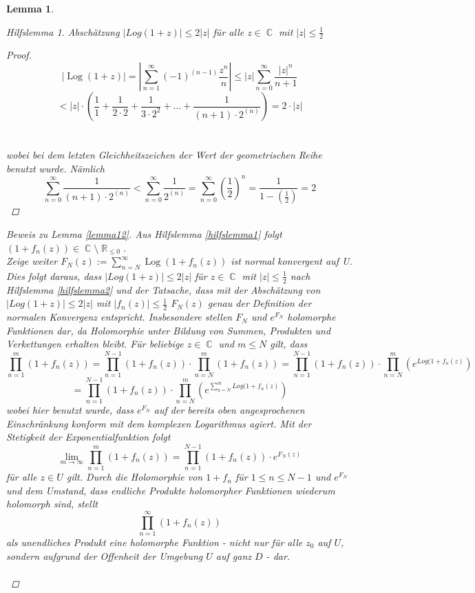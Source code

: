 \documentclass[10pt,a4paper]{article}
\theoremstyle{plain}
\newtheorem{lem}[thm]{Lemma}
\theoremstyle{definition}
\theoremstyle{remark}
\newtheorem{hilfslem}{Hilfslemma}
\DeclareMathOperator{\R}{\mathbb{R}}
\DeclareMathOperator{\C}{\mathbb{C}}
\DeclareMathOperator{\Log}{Log}
\begin{document}
\begin{lem}
\begin{hilfslem}
Abschätzung $ |Log(1+z)|\leq 2|z|$ für alle $z \in \C $ mit $ |z| \leq \frac{1}{2}$

\begin{proof}

$$|\Log(1+z)|= |\sum_{n = 1}^\infty (-1)^{(n-1)}\frac{z^{n}}{n}|\leq|z|\sum_{n = 0}^\infty\frac{|z|^{n}}{n + 1}$$
$$< |z|\cdot (\frac{1}{1}+\frac{1}{2\cdot 2}+\frac{1}{3 \cdot2^2}+...+\frac{1}{(n+1)\cdot2^(n)}) = 2\cdot|z| $$
\\
\\
wobei bei dem letzten Gleichheitszeichen der Wert der geometrischen Reihe benutzt wurde. Nämlich $$\sum_{n=0}^{\infty}\frac{1}{(n+1)\cdot2^{(n)}} < \sum_{n=0}^{\infty}\frac{1}{2^{(n)}} = \sum_{n=0}^{\infty}(\frac{1}{2})^n = \frac{1}{1-(\frac{1}{2})} = 2 $$

\end{proof}
\end{hilfslem}

\begin{proof}[Beweis zu Lemma \ref{lemma12}]
\noindent Aus Hilfslemma \ref{hilfslemma1} folgt $(1 + f_{n}(z)) \in \C \setminus \R_{\leq 0 }$. \\
 Zeige weiter $F_{N}(z) := \sum_{n = N}^\infty \Log( 1 + f_{n}(z))$ ist normal konvergent auf U. Dies folgt daraus, dass $| Log( 1 + z) | \leq 2|z| $ für $z \in \C$ mit $|z| \leq \frac{1}{2}$ nach Hilfslemma \ref{hilfslemma2}  und der Tatsache, dass mit der Abschätzung von $|Log(1+z)| \leq 2|z|$ mit $|f_n(z)|\leq \frac{1}{2}$ $F_{N}(z)$ genau der Definition der normalen Konvergenz entspricht.
Insbesondere stellen $F_{N}$ und $e^{F_{N}}$ holomorphe Funktionen dar, da Holomorphie unter Bildung von Summen, Produkten und Verkettungen erhalten bleibt. Für beliebige $z \in \C $ und $m\leq N$ gilt, dass 
$$\prod_{n = 1 }^{m}( 1 + f_{n}(z)) = \prod_{n = 1}^{N - 1}( 1 + f_{n}(z)) \cdot \prod_{n = N}^{m}( 1 + f_{n}(z))= \prod_{n = 1}^{N - 1}( 1 + f_{n}(z)) \cdot \prod_{n = N}^{m}(e^{Log( 1 + f_{n}(z)}) $$ $$= \prod_{n = 1}^{N - 1}( 1 + f_{n}(z)) \cdot \prod_{n = N}^{m}(e^{\sum_{n = N}^{m}Log( 1 + f_{n}(z)})$$
wobei hier benutzt wurde, dass $e^{F_{N}}$ auf der bereits oben angesprochenen Einschränkung konform mit dem komplexen Logarithmus agiert. Mit der Stetigkeit der Exponentialfunktion folgt $$\lim_{m\rightarrow\infty}\prod_{n=1}^m ( 1 + f_{n}(z)) =\prod_{n = 1}^{N - 1}(1 + f_{n}(z))\cdot e^{F_{N}(z)}$$ für alle $z \in U$ gilt. Durch die Holomorphie von $1+ f_{n}$ für $1 \leq n \leq N - 1$ und $e^{F_{N}}$ und dem Umstand, dass endliche Produkte holomorpher Funktionen wiederum holomorph sind, stellt $$\prod_{n =1}^{\infty}(1 +f_n (z))$$ als unendliches Produkt eine holomorphe Funktion - nicht nur für alle $z_0$ auf $U$, sondern aufgrund der Offenheit der Umgebung $U$ auf ganz $D$ - dar.
\\
\\
\end{proof}
\end{lem}
\end{document}
